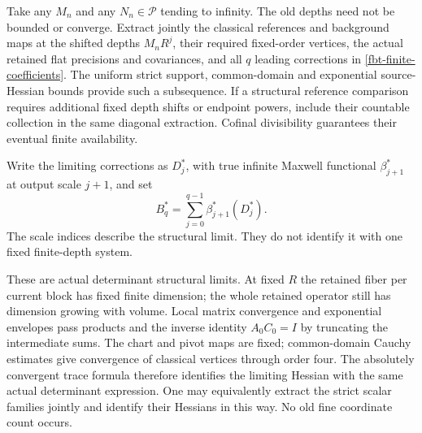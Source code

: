 \documentclass[11pt]{article}
\theoremstyle{remark}
\begin{document}
Take any \(M_n\) and any \(N_n\in\mathcal P\) tending to
infinity. The old depths need not be bounded or converge.
Extract jointly the classical references and background
maps at the shifted depths \(M_nR^j\), their required
fixed-order vertices, the actual retained flat precisions
and covariances, and all \(q\) leading corrections in
\eqref{fbt-finite-coefficients}.
The uniform strict support, common-domain and exponential
source-Hessian bounds provide such a subsequence. If a
structural reference comparison requires additional fixed
depth shifts or endpoint powers, include their countable
collection in the same diagonal extraction. Cofinal
divisibility guarantees their eventual finite availability.

Write the limiting corrections as \(D_j^*\), with true
infinite Maxwell functional \(\beta_{j+1}^*\) at output
scale \(j+1\), and set
\begin{equation}
                       B_q^*=\sum_{j=0}^{q-1}
                                         \beta_{j+1}^*(D_j^*).
 \label{fbt-limit-sum}
\end{equation}
The scale indices describe the structural limit. They
do not identify it with one fixed finite-depth system.

These are actual determinant structural limits. At fixed
\(R\) the retained fiber per current block has fixed finite dimension;
the whole retained operator still has dimension growing with volume.
Local matrix convergence and exponential envelopes pass
products and the inverse identity \(A_0C_0=I\) by truncating
the intermediate sums. The chart and pivot maps are fixed;
common-domain Cauchy estimates give convergence of classical
vertices through order four. The absolutely convergent
trace formula therefore identifies the limiting Hessian
with the same actual determinant expression. One may
equivalently extract the strict scalar families jointly
and identify their Hessians in this way. No old fine
coordinate count occurs.
\end{document}
